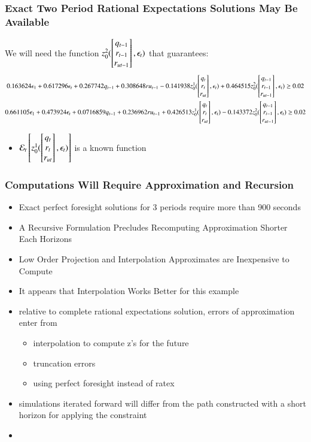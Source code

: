 \documentclass{beamer}
\begin{document}
    \begin{frame}
\frametitle{Exact Two Period Rational Expectations Solutions May Be Available}

We will need the function {\small $z_0^2(\begin{bmatrix} q_{t-1}\\r_{t-1}\\r_{ut-1} \end{bmatrix},\epsilon_t)$ }that guarantees:
{\tiny 
\begin{gather*}
 0.163624 \epsilon_{1}+  0.617296 \epsilon_t+0.267742 q_{t-1}+0.308648 ru_{t-1}-0.141938
      z_0^1(\begin{bmatrix} q_t\\r_{t}\\r_{ut} \end{bmatrix},\epsilon_t)+0.464515 z_0^2(\begin{bmatrix} q_{t-1}\\r_{t-1}\\r_{ut-1} \end{bmatrix},\epsilon_t) \ge 0.02\\  
    0.661105 \epsilon_{1}+    0.473924 \epsilon_t+0.0716859 q_{t-1}+0.236962 ru_{t-1}+0.426513
      z_0^1(\begin{bmatrix} q_t\\r_{t}\\r_{ut} \end{bmatrix},\epsilon_t)-0.143372 z_0^2(\begin{bmatrix} q_{t-1}\\r_{t-1}\\r_{ut-1} \end{bmatrix},\epsilon_t)  \ge 0.02 \\
\end{gather*}
}
\begin{itemize}
\item {\small $\mathcal{E}_{t} \left [z_0^1(\begin{bmatrix} q_t\\r_{t}\\r_{ut} \end{bmatrix},\epsilon_t) \right ]$ } is a known function
\end{itemize}
    \end{frame}
    \begin{frame}
      \frametitle{Computations Will Require Approximation and
        Recursion}
      \begin{itemize}
      \item Exact perfect foresight solutions for 3 periods require more than 900 seconds
      \item A Recursive Formulation Precludes Recomputing Approximation Shorter Each Horizons
      \item Low Order Projection and Interpolation Approximates are Inexpensive to Compute
      \item It appears that Interpolation Works Better for this example
      \end{itemize}
    \end{frame}

    \begin{itemize}
    \item relative to complete rational expectations solution, 
errors of approximation enter from 
\begin{itemize}
\item interpolation to compute z's for the future
\item truncation errors
\item using perfect foresight instead of ratex
\end{itemize}
\item simulations iterated forward will differ from the path constructed with a short horizon for applying the constraint
  \item
    \end{itemize}
%
\end{document}
